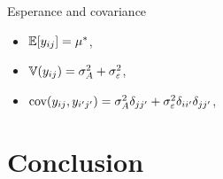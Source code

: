 \documentclass[unknownkeysallowed]{beamer}
\begin{document}
\begin{frame}{Esperance and covariance}
\begin{itemize}
    \item $\mathbb{E}[y_{ij}]=\mu^* $, 
    \item $\mathbb{V}(y_{ij})=\sigma_A^2 + \sigma_{\varepsilon}^2$,
    \item $\operatorname{cov}(y_{ij},y_{i'j'})=\sigma_A^2\delta_{jj'} + \sigma_{\varepsilon}^2\delta_{ii'}\delta_{jj'}$,
\end{itemize}


\end{frame}



\section{Conclusion}
\label{sec:conclusion}
\end{document}
